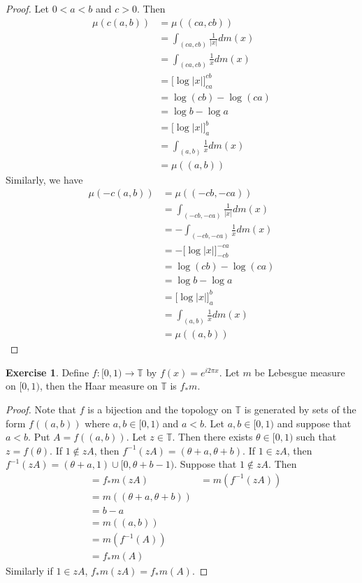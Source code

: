 \documentclass[12pt]{amsart}
\theoremstyle{definition}
\newtheorem{ex}[definition]{Exercise}
\newcommand{\T}{\mathbb{T}}
\newcommand{\lex}[1]{\label{ex:#1}}
\begin{document}
	\begin{proof}
		Let $0 < a < b$ and $c >0$. Then
		\begin{align*}
			\mu(c(a, b))
			& = \mu((ca,cb)) \\
			& = \int_{(ca,cb)} \frac{1}{|x|} dm(x)\\
			& = \int_{(ca,cb)} \frac{1}{x} dm(x)\\
			& = \bigg[ \log|x| \bigg]_{ca}^{cb} \\
			& = \log(cb) - \log(ca) \\
			& = \log b - \log a \\
			& = \bigg[ \log|x| \bigg]_{a}^{b} \\ 
			& =  \int_{(a,b)} \frac{1}{x} dm(x)\\
			& = \mu((a,b))
		\end{align*}
	Similarly, we have
	\begin{align*}
		\mu(-c(a, b))
		& = \mu((-cb,-ca)) \\
		& = \int_{(-cb,-ca)} \frac{1}{|x|} dm(x)\\
		& = - \int_{(-cb,-ca)} \frac{1}{x} dm(x)\\
		& = - \bigg[ \log|x| \bigg]_{-cb}^{-ca} \\
		& = \log(cb) - \log(ca) \\
		& = \log b - \log a \\
		& = \bigg[ \log|x| \bigg]_{a}^{b} \\ 
		& =  \int_{(a,b)} \frac{1}{x} dm(x)\\
		& = \mu((a,b))
	\end{align*}
	\end{proof}

	\begin{ex} \lex{00000} 
		Define $f: [ 0,1) \rightarrow \T$ by $f(x) = e^{i2 \pi x}$. Let $m$ be Lebesgue measure on $[0,1)$, then the Haar measure on $\T$ is $f_*m$.
	\end{ex}

	\begin{proof}
		Note that $f$ is a bijection and the topology on $\T$ is generated by sets of the form $f((a, b))$ where $a,b \in [0,1)$ and $a< b$. Let $a,b \in [ 0,1 )$ and suppose that $a<b$. Put $A = f((a, b))$. Let $z \in \T$. Then there exists $\theta \in [0, 1)$ such that $z = f(\theta)$. If $1 \not \in zA$, then $f^{-1}(zA) = (\theta + a, \theta + b)$. If $1 \in zA$, then $f^{-1}(zA) = (\theta + a , 1) \cup [0,  \theta + b - 1)$. Suppose that $1 \not \in zA$. Then
		\begin{align*}
			& = f_*m(zA) 
			& = m(f^{-1}(zA)) \\
			& = m((\theta + a, \theta + b)) \\
			& = b - a \\
			& = m((a,b)) \\
			& = m(f^{-1}(A)) \\
			& = f_*m(A)
		\end{align*}
	Similarly if $1 \in zA$, $f_*m(zA) = f_*m(A)$.
	\end{proof} 
\end{document}
